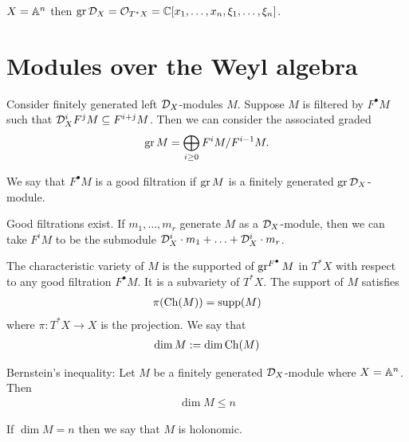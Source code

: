 \documentclass[12pt]{article}
\begin{document}
\begin{example}
    $X = \mathbb{A}^n$ then $\operatorname{gr} {\mathcal{D}}_X = {\mathcal{O}}_{T^*X} = \mathbb{C}[x_1, \ldots, x_n, \xi_1, \ldots, \xi_n]$.
\end{example}

\section{Modules over the Weyl algebra}
Consider finitely generated left ${\mathcal{D}}_X$-modules $M$.
Suppose $M$ is filtered by $F^\bullet M$ such that ${\mathcal{D}}_X^iF^jM \subseteq F^{i+j}M$. 
Then we can consider the associated graded \begin{align*}
    \operatorname{gr} M = \bigoplus_{i\geq 0} F^iM/F^{i-1}M.
\end{align*} \begin{definition}
    We say that $F^\bullet M$ is a good filtration if $\operatorname{gr} M$ is a finitely generated $\operatorname{gr} {\mathcal{D}}_X$-module.
\end{definition}

\begin{example}
    Good filtrations exist. If $m_1, \ldots, m_r$ generate $M$ as a ${\mathcal{D}}_X$-module,
    then we can take $F^iM$ to be the submodule ${\mathcal{D}}_X^i\cdot m_1 + \ldots + {\mathcal{D}}_X^i\cdot m_r$.
\end{example}

\begin{definition}
    The characteristic variety of $M$ is the supported of $\operatorname{gr}^{F^\bullet} M$ in $T^*X$
    with respect to any good filtration $F^\bullet M$. It is 
    a subvariety of $T^*X$. The support of $M$ satisfies 
    \begin{align*}
        \pi(\operatorname{Ch}(M)) = \operatorname{supp}(M)
    \end{align*} where $\pi: T^*X\to X$ is the projection.
    We say that \begin{align*}
        \dim M := \dim \operatorname{Ch}(M)
    \end{align*}
\end{definition}

\begin{theorem}
    Bernstein's inequality: Let $M$ be a finitely generated ${\mathcal{D}}_X$-module where $X = \mathbb{A}^n$. Then \begin{align*}
        \dim M \leq n
    \end{align*} 
\end{theorem}

\begin{definition}
    If $\dim M = n$ then we say that $M$ is holonomic.
\end{definition}
\end{document}
